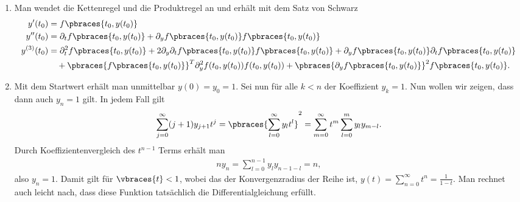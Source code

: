 \begin{solution}
    \begin{enumerate}[label = \alph*)]
        \item Man wendet die Kettenregel und die Produktregel an und erhält mit dem Satz von Schwarz
        \begin{align*}
            y^\prime(t_0) &= f\pbraces{t_0, y(t_0)} \\
            y^{\prime\prime}(t_0) &= \partial_t f\pbraces{t_0, y(t_0)} + \partial_y f\pbraces{t_0, y(t_0)} f\pbraces{t_0, y(t_0)} \\
            y^{(3)}(t_0) &= \partial_t^2 f\pbraces{t_0, y(t_0)} + 2 \partial_y \partial_t f\pbraces{t_0,y(t_0)} f\pbraces{t_0, y(t_0)} + \partial_y f\pbraces{t_0, y(t_0)} \partial_t f\pbraces{t_0,y(t_0)} \\
            & \quad + \pbraces{f\pbraces{t_0, y(t_0)}}^T \partial_y^2 f(t_0, y(t_0)) f(t_0, y(t_0)) + \pbraces{\partial_y f\pbraces{t_0, y(t_0)}}^2 f\pbraces{t_0, y(t_0)} .
        \end{align*}

        \item Mit dem Startwert erhält man unmittelbar $y(0) = y_0 = 1$. Sei nun für alle $k < n$ der Koeffizient $y_k = 1$. Nun wollen wir zeigen, dass dann auch $y_n = 1$ gilt. In jedem Fall gilt
        \begin{align*}
            \sum_{j = 0}^\infty (j+1) y_{j + 1} t^j = \pbraces{\sum_{l = 0}^\infty y_l t^l}^2 = \sum_{m = 0}^\infty t^m \sum_{l = 0}^m y_l y_{m-l} .
        \end{align*}
        Durch Koeffizientenvergleich des $t^{n-1}$ Terms erhält man
        \begin{align*}
            n y_n = \sum_{l = 0}^{n - 1} y_l y_{n - 1 -l} = n ,
        \end{align*}
        also $y_n = 1$. Damit gilt für $\vbraces{t} < 1$, wobei das der Konvergenzradius der Reihe ist, $y(t) = \sum_{n = 0}^\infty t^n = \frac{1}{1 - t}$. Man rechnet auch leicht nach, dass diese Funktion tatsächlich die Differentialgleichung erfüllt.
    \end{enumerate}
\end{solution}
